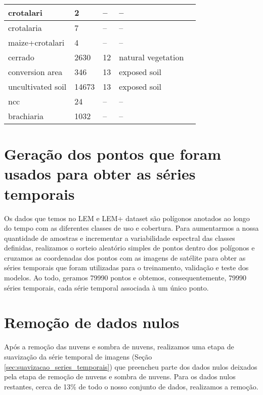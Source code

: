 \begin{table}[H]
\begin{adjustbox}{width=0.5\textwidth}
\begin{tabular}{|l|l|l|l|l|}
crotalari         & 2                       & --                & --                 \\ \hline
crotalaria        & 7                       & --                & --                 \\ \hline
maize+crotalari   & 4                       & --                & --                 \\ \hline
cerrado           & 2630                    & 12                & natural vegetation \\ \hline
conversion area   & 346                     & 13                & exposed soil       \\ \hline
uncultivated soil & 14673                   & 13                & exposed soil       \\ \hline
ncc               & 24                      & --                & --                 \\ \hline
brachiaria        & 1032                    & --                & --                 \\ \hline     
\end{tabular}
\end{adjustbox}
\end{table}

\section{Geração dos pontos que foram usados para obter as séries temporais}

Os dados que temos no LEM e LEM+ dataset são polígonos anotados ao longo do tempo com as diferentes classes de uso e cobertura. Para aumentarmos a nossa quantidade de amostras e incrementar a variabilidade espectral das classes definidas, realizamos o sorteio aleatório simples de pontos dentro dos polígonos e cruzamos as coordenadas dos pontos com as imagens de satélite para obter as séries temporais que foram utilizadas para o treinamento, validação e teste dos modelos. Ao todo, geramos 79990 pontos e obtemos, consequentemente, 79990 séries temporais, cada série temporal associada à um único ponto. 

\section{Remoção de dados nulos}

Após a remoção das nuvens e sombra de nuvens, realizamos uma etapa de suavização da série temporal de imagens (Seção \ref{sec:suavizacao_series_temporais}) que preencheu parte dos dados nulos deixados pela etapa de remoção de nuvens e sombra de nuvens. Para os dados nulos restantes, cerca de 13\% de todo o nosso conjunto de dados, realizamos a remoção. 

\renewcommand{\cleardoublepage}{}
\renewcommand{\clearpage}{}
\vspace{5mm}